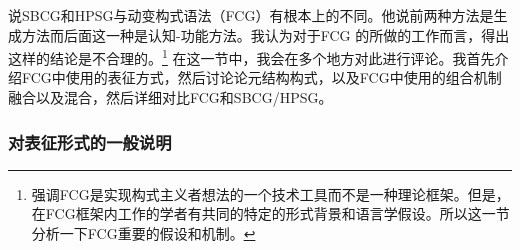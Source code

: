 说SBCG和HPSG与动变构式语法（FCG）有根本上的不同。他说前两种方法是生成方法而后面这一种是认知-功能方法。我认为对于FCG 的所做的工作而言，得出这样的结论是不合理的。\footnote{\label{Steels-FCG-System}%
  \citet[]{Steels2013a}强调FCG是实现构式主义者想法的一个技术工具而不是一种理论框架。但是，在FCG框架内工作的学者有共同的特定的形式背景和语言学假设。所以这一节分析一下FCG重要的假设和机制。} 在这一节中，我会在多个地方对此进行评论。我首先介绍FCG中使用的表征方式，然后讨论论元结构构式，以及FCG中使用的组合机制融合以及混合，然后详细对比FCG和SBCG/HPSG。

\subsubsection{对表征形式的一般说明}

